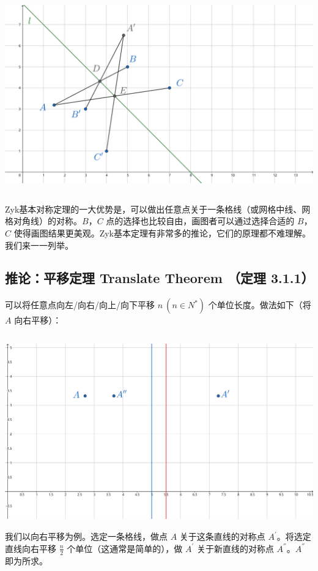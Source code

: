\documentclass[UTF8]{article}
\begin{document}
\includegraphics[width=5.76806in,height=3.32431in]{media/image4.png}

Zyk基本对称定理的一大优势是，可以做出任意点关于一条格线（或网格中线、网格对角线）的对称。\(B\)，\(C\)
点的选择也比较自由，画图者可以通过选择合适的 \(B\)，\(C\)
使得画图结果更美观。Zyk基本定理有非常多的推论，它们的原理都不难理解。我们来一一列举。

\hypertarget{ux63a8ux8bbaux5e73ux79fbux5b9aux7406-translate-theorem-ux5b9aux7406-3.1.1}{%
\subsection{推论：平移定理 Translate Theorem （定理
3.1.1）}\label{ux63a8ux8bbaux5e73ux79fbux5b9aux7406-translate-theorem-ux5b9aux7406-3.1.1}}

可以将任意点向左/向右/向上/向下平移 \(n\ \left( n \in N^{*} \right)\)
个单位长度。做法如下（将 \(A\) 向右平移）：

\includegraphics[width=5.76806in,height=3.27847in]{media/image5.png}我们以向右平移为例。选定一条格线，做点
\(A\) 关于这条直线的对称点 \(A^{'}\)。将选定直线向右平移 \(\frac{n}{2}\)
个单位（这通常是简单的），做 \(A^{'}\) 关于新直线的对称点
\(A^{''}\)。\(A^{''}\) 即为所求。
\end{document}

